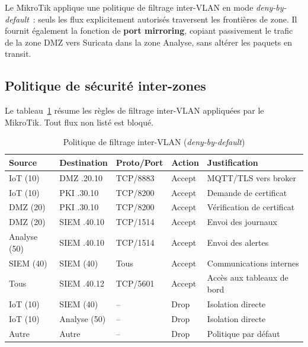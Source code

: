 Le MikroTik applique une politique de filtrage inter-VLAN en mode \emph{deny-by-default}~: seuls les flux explicitement autorisés traversent les frontières de zone. Il fournit également la fonction de \textbf{port mirroring}, copiant passivement le trafic de la zone DMZ vers Suricata dans la zone Analyse, sans altérer les paquets en transit.

\subsection{Politique de sécurité inter-zones}
\label{subsec:env-acl}

Le tableau~\ref{tab:acl-inter-zones} résume les règles de filtrage inter-VLAN appliquées par le MikroTik. Tout flux non listé est bloqué.

\begin{table}[!htbp]
\centering
\caption{Politique de filtrage inter-VLAN (\emph{deny-by-default})}
\label{tab:acl-inter-zones}
\small
\begin{tabularx}{\linewidth}{|l|l|l|l|>{\raggedright\arraybackslash}X|}
\hline
\textbf{Source} & \textbf{Destination} & \textbf{Proto/Port} & \textbf{Action} & \textbf{Justification} \\
\hline
IoT (10) & DMZ .20.10  & TCP/8883 & Accept & MQTT/TLS vers broker       \\ \hline
IoT (10) & PKI .30.10  & TCP/8200 & Accept & Demande de certificat      \\ \hline
DMZ (20) & PKI .30.10  & TCP/8200 & Accept & Vérification de certificat \\ \hline
DMZ (20) & SIEM .40.10 & TCP/1514 & Accept & Envoi des journaux         \\ \hline
Analyse (50) & SIEM .40.10 & TCP/1514 & Accept & Envoi des alertes      \\ \hline
SIEM (40) & SIEM (40)  & Tous     & Accept & Communications internes    \\ \hline
Tous     & SIEM .40.12 & TCP/5601 & Accept & Accès aux tableaux de bord \\ \hline
IoT (10) & SIEM (40)   & --       & Drop   & Isolation directe          \\ \hline
IoT (10) & Analyse (50)& --       & Drop   & Isolation directe          \\ \hline
Autre    & Autre       & --       & Drop   & Politique par défaut       \\ \hline
\end{tabularx}
\end{table}


